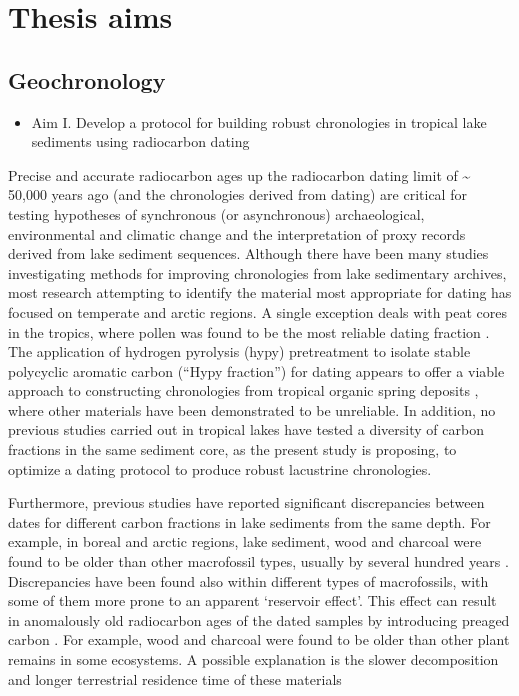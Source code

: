 \documentclass[
  12pt,
]{book}
\providecommand{\tightlist}{%
  \setlength{\itemsep}{0pt}\setlength{\parskip}{0pt}}
\begin{document}
\hypertarget{thesis-aims}{%
\section{Thesis aims}\label{thesis-aims}}

\hypertarget{geochronology}{%
\subsection{Geochronology}\label{geochronology}}

\begin{itemize}
\tightlist
\item
  Aim I. Develop a protocol for building robust chronologies in tropical lake sediments using radiocarbon dating
\end{itemize}

Precise and accurate radiocarbon ages up the radiocarbon dating limit of \textasciitilde{} 50,000 years ago (and the chronologies derived from dating) are critical for testing hypotheses of synchronous (or asynchronous) archaeological, environmental and climatic change and the interpretation of proxy records derived from lake sediment sequences. Although there have been many studies investigating methods for improving chronologies from lake sedimentary archives, most research attempting to identify the material most appropriate for dating has focused on temperate and arctic regions. A single exception deals with peat cores in the tropics, where pollen was found to be the most reliable dating fraction \citep{wustComparisonRadiocarbonAges2008}. The application of hydrogen pyrolysis (hypy) pretreatment to isolate stable polycyclic aromatic carbon (``Hypy fraction'') for dating appears to offer a viable approach to constructing chronologies from tropical organic spring deposits \citep{fieldUntanglingGeochronologicalComplexity2018}, where other materials have been demonstrated to be unreliable. In addition, no previous studies carried out in tropical lakes have tested a diversity of carbon fractions in the same sediment core, as the present study is proposing, to optimize a dating protocol to produce robust lacustrine chronologies.

Furthermore, previous studies have reported significant discrepancies between dates for different carbon fractions in lake sediments from the same depth. For example, in boreal and arctic regions, lake sediment, wood and charcoal were found to be older than other macrofossil types, usually by several hundred years \citep{oswaldEffectsSampleMass2005}. Discrepancies have been found also within different types of macrofossils, with some of them more prone to an apparent `reservoir effect'. This effect can result in anomalously old radiocarbon ages of the dated samples by introducing preaged carbon \citep{alvesWorldwideMarineRadiocarbon2018}. For example, wood and charcoal were found to be older than other plant remains in some ecosystems. A possible explanation is the slower decomposition and longer terrestrial residence time of these materials \citep{oswaldEffectsSampleMass2005}
\end{document}
